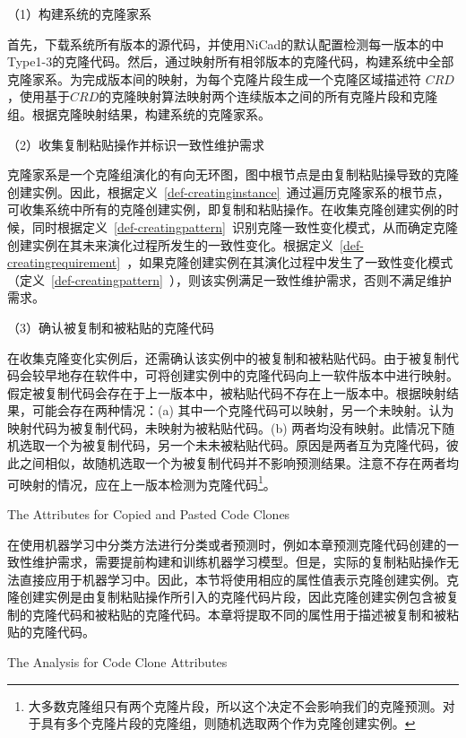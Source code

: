 （1）构建系统的克隆家系

首先，下载系统所有版本的源代码，并使用NiCad的默认配置检测每一版本的中Type1-3的克隆代码。然后，通过映射所有相邻版本的克隆代码，构建系统中全部克隆家系。为完成版本间的映射，为每个克隆片段生成一个克隆区域描述符 $CRD$\cite{duala2010clone}，使用基于$CRD$的克隆映射算法映射两个连续版本之间的所有克隆片段和克隆组\cite{ci2013new,ci2013newD}。根据克隆映射结果，构建系统的克隆家系。

（2）收集复制粘贴操作并标识一致性维护需求

克隆家系是一个克隆组演化的有向无环图，图中根节点是由复制粘贴操导致的克隆创建实例。因此，根据定义~\ref{def-creatinginstance}~通过遍历克隆家系的根节点，可收集系统中所有的克隆创建实例，即复制和粘贴操作。在收集克隆创建实例的时候，同时根据定义~\ref{def-creatingpattern}~识别克隆一致性变化模式，从而确定克隆创建实例在其未来演化过程所发生的一致性变化。根据定义~\ref{def-creatingrequirement}~，如果克隆创建实例在其演化过程中发生了一致性变化模式（定义~\ref{def-creatingpattern}~），则该实例满足一致性维护需求，否则不满足维护需求。

（3）确认被复制和被粘贴的克隆代码

在收集克隆变化实例后，还需确认该实例中的被复制和被粘贴代码。由于被复制代码会较早地存在软件中，可将创建实例中的克隆代码向上一软件版本中进行映射。假定被复制代码会存在于上一版本中，被粘贴代码不存在上一版本中。根据映射结果，可能会存在两种情况：(a) 其中一个克隆代码可以映射，另一个未映射。认为映射代码为被复制代码，未映射为被粘贴代码。(b) 两者均没有映射。此情况下随机选取一个为被复制代码，另一个未未被粘贴代码。原因是两者互为克隆代码，彼此之间相似，故随机选取一个为被复制代码并不影响预测结果。注意不存在两者均可映射的情况，应在上一版本检测为克隆代码\footnote{大多数克隆组只有两个克隆片段，所以这个决定不会影响我们的克隆预测。对于具有多个克隆片段的克隆组，则随机选取两个作为克隆创建实例。}。

{The Attributes for Copied and Pasted Code Clones}
\label{lab-creatingattribute}

在使用机器学习中分类方法进行分类或者预测时，例如本章预测克隆代码创建的一致性维护需求，需要提前构建和训练机器学习模型。但是，实际的复制粘贴操作无法直接应用于机器学习中。因此，本节将使用相应的属性值表示克隆创建实例。克隆创建实例是由复制粘贴操作所引入的克隆代码片段，因此克隆创建实例包含被复制的克隆代码和被粘贴的克隆代码。本章将提取不同的属性用于描述被复制和被粘贴的克隆代码。%

{The Analysis for Code Clone Attributes}

